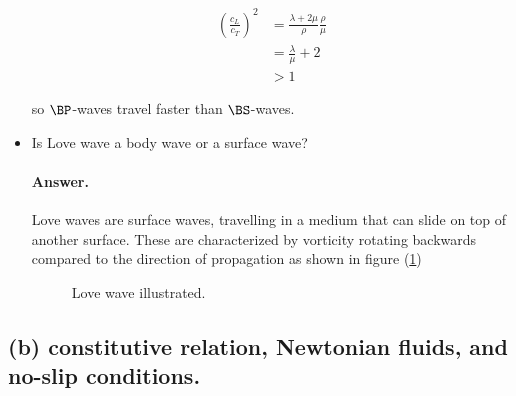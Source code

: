 \begin{itemize}
\begin{align*}
\left( \frac{c_L}{c_T} \right)^2 
&= \frac{ \lambda + 2 \mu}{\rho} \frac{\rho}{\mu}  \\
&= \frac{\lambda}{\mu} + 2  \\
&> 1
\end{align*}

so $\BP$-waves travel faster than $\BS$-waves.

\item Is Love wave a body wave or a surface wave?

\paragraph{Answer.}

Love waves are surface waves, travelling in a medium that can slide on top of another surface.  These are characterized by vorticity rotating backwards compared to the direction of propagation as shown in figure (\ref{fig:continuumMidtermReflection:continuumMidtermReflectionFig2})

\begin{figure}[htp]
   \centering
   \def\svgwidth{0.6\columnwidth}
   
   \caption{Love wave illustrated.}\label{fig:continuumMidtermReflection:continuumMidtermReflectionFig2}
\end{figure}
\end{itemize}

\subsection{(b) constitutive relation, Newtonian fluids, and no-slip conditions.}


